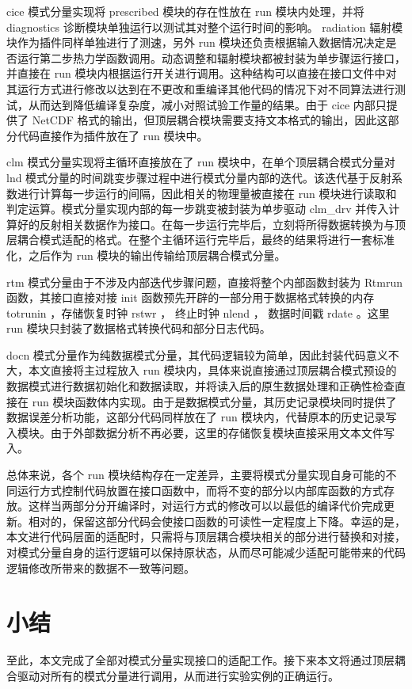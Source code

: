 cice 模式分量实现将 prescribed 模块的存在性放在 run 模块内处理，并将 diagnostics 诊断模块单独运行以测试其对整个运行时间的影响。 radiation 辐射模块作为插件同样单独进行了测速，另外 run 模块还负责根据输入数据情况决定是否运行第二步热力学函数调用。动态调整和辐射模块都被封装为单步骤运行接口，并直接在 run 模块内根据运行开关进行调用。这种结构可以直接在接口文件中对其运行方式进行修改以达到在不更改和重编译其他代码的情况下对不同算法进行测试，从而达到降低编译复杂度，减小对照试验工作量的结果。由于 cice 内部只提供了 NetCDF 格式的输出，但顶层耦合模块需要支持文本格式的输出，因此这部分代码直接作为插件放在了 run 模块中。

clm 模式分量实现将主循环直接放在了 run 模块中，在单个顶层耦合模式分量对 lnd 模式分量的时间跳变步骤过程中进行模式分量内部的迭代。该迭代基于反射系数进行计算每一步运行的间隔，因此相关的物理量被直接在 run 模块进行读取和判定运算。模式分量实现内部的每一步跳变被封装为单步驱动 clm\_drv 并传入计算好的反射相关数据作为接口。在每一步运行完毕后，立刻将所得数据转换为与顶层耦合模式适配的格式。在整个主循环运行完毕后，最终的结果将进行一套标准化，之后作为 run 模块的输出传输给顶层耦合模式分量。

rtm 模式分量由于不涉及内部迭代步骤问题，直接将整个内部函数封装为 Rtmrun 函数，其接口直接对接 init 函数预先开辟的一部分用于数据格式转换的内存 totrunin ，存储恢复时钟 rstwr ， 终止时钟 nlend ， 数据时间戳 rdate 。这里 run 模块只封装了数据格式转换代码和部分日志代码。

docn 模式分量作为纯数据模式分量，其代码逻辑较为简单，因此封装代码意义不大，本文直接将主过程放入 run 模块内，具体来说直接通过顶层耦合模式预设的数据模式进行数据初始化和数据读取，并将读入后的原生数据处理和正确性检查直接在 run 模块函数体内实现。由于是数据模式分量，其历史记录模块同时提供了数据误差分析功能，这部分代码同样放在了 run 模块内，代替原本的历史记录写入模块。由于外部数据分析不再必要，这里的存储恢复模块直接采用文本文件写入。

总体来说，各个 run 模块结构存在一定差异，主要将模式分量实现自身可能的不同运行方式控制代码放置在接口函数中，而将不变的部分以内部库函数的方式存放。这样当两部分分开编译时，对运行方式的修改可以以最低的编译代价完成更新。相对的，保留这部分代码会使接口函数的可读性一定程度上下降。幸运的是，本文进行代码层面的适配时，只需将与顶层耦合模块相关的部分进行替换和对接，对模式分量自身的运行逻辑可以保持原状态，从而尽可能减少适配可能带来的代码逻辑修改所带来的数据不一致等问题。

\section{小结}

至此，本文完成了全部对模式分量实现接口的适配工作。接下来本文将通过顶层耦合驱动对所有的模式分量进行调用，从而进行实验实例的正确运行。
